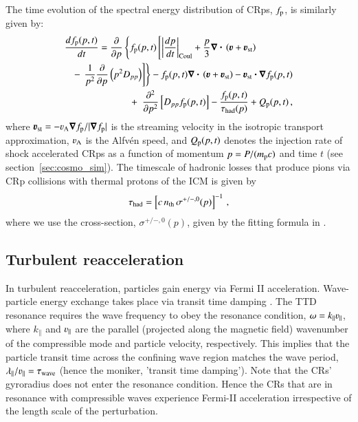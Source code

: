 \documentclass[fleqn,usenatbib,useAMS]{mnras}
\newcommand{\bcdot}{\ensuremath{%
  \mathchoice%
   {\mskip\thinmuskip\lower0.2ex\hbox{\scalebox{1.5}{$\cdot$}}\mskip\thinmuskip}}%
   {\mskip\thinmuskip\lower0.2ex\hbox{\scalebox{1.5}{$\cdot$}}\mskip\thinmuskip}%
   {\lower0.3ex\hbox{\scalebox{1.2}{$\cdot$}}}%
   {\lower0.3ex\hbox{\scalebox{1.2}{$\cdot$}}}%
}
\newcommand\cp[1]{{\color{red} #1}}
\newcommand{\bvel}{\ensuremath{\boldsymbol{\varv}}}
\newcommand{\bnabla}{\ensuremath{\boldsymbol{\nabla}}}
\begin{document}
The time evolution of the spectral energy distribution of CRps,
$f_{{\mathrm{p}}}$, is similarly given by:
\begin{eqnarray}
\lefteqn{
  {{d f_{\rmn{p}}(p,t)}\over{d t}} =
  {{\partial }\over{\partial p}}
  \left\{
  f_{\rmn{p}}(p,t)\left[ \left|{{d p}\over{d t}}\right|_{\rm Coul}
    + \frac{p}{3}\bnabla\bcdot \left(\bvel+\bvel_{\rmn{st}}\right)\right.\right.}
\nonumber\\
&&-\left.\left. {1\over{p^2}}{{\partial }\over{\partial p}}\left(p^2 D_{pp}\right)
\right]\right\} - f_{\rmn{p}}(p,t) \bnabla\bcdot \left(\bvel+\bvel_{\rmn{st}}\right) 
- \bvel_{\rmn{st}}\bcdot\bnabla f_{\rmn{p}}(p,t)
\nonumber\\
&&+\,\,\, {{\partial^2 }\over{\partial p^2}}
\left[ D_{pp} f_{\rmn{p}}(p,t) \right] - {{f_{\rmn{p}}(p,t)}\over{\tau_{\rm had}(p)}}
+ Q_{\rmn{p}}(p,t)\, ,
\label{eq:FP_p}
\end{eqnarray}
where $\bvel_{\rmn{st}}=-\varv_{\rmn{A}}\bnabla f_{\rmn{p}}/|\bnabla
f_{\rmn{p}}|$ is the streaming velocity in the isotropic transport
approximation, $\varv_{\rmn{A}}$ is the Alfv\'en speed,
and $Q_{{\mathrm{p}}}(p,t)$ denotes the injection rate of shock accelerated
CRps as a function of momentum \cp{$p=P/(m_{{\mathrm{p}}} c)$} and time $t$ (see
section~\ref{sec:cosmo_sim}). The timescale of
hadronic losses that produce pions via CRp collisions with thermal
protons of the ICM is given by 
\begin{eqnarray}
  \tau_{\rm had} = \left[c\,n_{\mathrm{th}}\,\sigma^{+/-,0}(p)\right]^{-1}\,,
\end{eqnarray}
where we use the cross-section, $\sigma^{+/-,0}(p)$, given by the
fitting formula in \citet{1986ApJ...307...47D}.

\subsection{Turbulent reacceleration}
\label{sec:reacc}

In turbulent reacceleration, particles gain energy via Fermi II acceleration. Wave-particle energy exchange takes place via transit time damping \citep[TTD,][]{brunetti07,brunetti11}. The
TTD resonance requires the wave frequency to obey the resonance
condition, $\omega=k_\parallel\varv_\parallel$, where $k_\parallel$
and $\varv_\parallel$ are the parallel (projected along the magnetic
field) wavenumber of the compressible mode and particle velocity, respectively. This implies
that the particle transit time across the confining wave region
matches the wave period,
$\lambda_{\parallel}/\varv_{\parallel}=\tau_{\rmn{wave}}$ (hence the moniker, 'transit time damping'). Note that the CRs'
gyroradius does not enter the resonance condition. Hence the CRs that
are in resonance with compressible waves experience Fermi-II
acceleration irrespective of the length scale of the perturbation.
\end{document}
